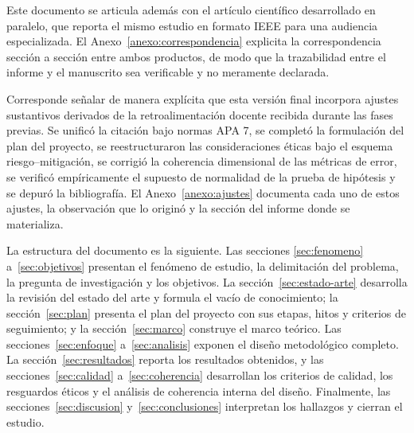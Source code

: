 Este documento se articula además con el artículo científico desarrollado en
paralelo, que reporta el mismo estudio en formato IEEE para una audiencia
especializada. El Anexo~\ref{anexo:correspondencia} explicita la correspondencia
sección a sección entre ambos productos, de modo que la trazabilidad entre el
informe y el manuscrito sea verificable y no meramente declarada.

Corresponde señalar de manera explícita que esta versión final incorpora
ajustes sustantivos derivados de la retroalimentación docente recibida durante
las fases previas. Se unificó la citación bajo normas APA 7, se completó la
formulación del plan del proyecto, se reestructuraron las consideraciones éticas
bajo el esquema riesgo--mitigación, se corrigió la coherencia dimensional de las
métricas de error, se verificó empíricamente el supuesto de normalidad de la
prueba de hipótesis y se depuró la bibliografía. El Anexo~\ref{anexo:ajustes}
documenta cada uno de estos ajustes, la observación que lo originó y la sección
del informe donde se materializa.

La estructura del documento es la siguiente. Las secciones \ref{sec:fenomeno}
a~\ref{sec:objetivos} presentan el fenómeno de estudio, la delimitación del
problema, la pregunta de investigación y los objetivos. La
sección~\ref{sec:estado-arte} desarrolla la revisión del estado del arte y
formula el vacío de conocimiento; la sección~\ref{sec:plan} presenta el plan del
proyecto con sus etapas, hitos y criterios de seguimiento; y la
sección~\ref{sec:marco} construye el marco teórico. Las
secciones~\ref{sec:enfoque} a~\ref{sec:analisis} exponen el diseño metodológico
completo. La sección~\ref{sec:resultados} reporta los resultados obtenidos, y
las secciones~\ref{sec:calidad} a~\ref{sec:coherencia} desarrollan los criterios
de calidad, los resguardos éticos y el análisis de coherencia interna del
diseño. Finalmente, las secciones~\ref{sec:discusion} y~\ref{sec:conclusiones}
interpretan los hallazgos y cierran el estudio.
